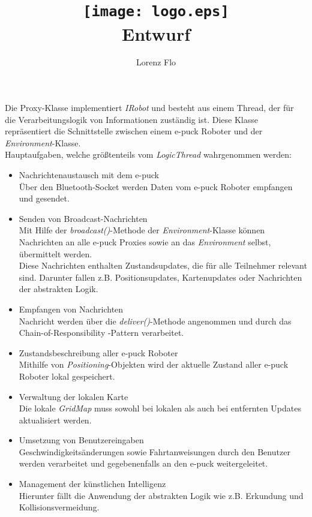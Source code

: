 \documentclass[10pt,a4paper]{article}
\title{
	\texttt{[image: logo.eps]} \\
	\vspace{1cm}
	Entwurf
}
\author{Lorenz Flo}
\begin{document}
	Die Proxy-Klasse implementiert \textit{IRobot} und besteht aus einem Thread, der für die Verarbeitungslogik von
	Informationen zuständig ist. Diese Klasse repräsentiert die Schnittstelle zwischen einem e-puck Roboter und der
	\textit{Environment}-Klasse. \\
	Hauptaufgaben, welche größtenteils vom \textit{LogicThread} wahrgenommen werden:
	\begin{itemize}
		\item Nachrichtenaustausch mit dem e-puck \\
			Über den Bluetooth-Socket werden Daten vom e-puck Roboter empfangen und gesendet.
		\item Senden von Broadcast-Nachrichten \\
			Mit Hilfe der \textit{broadcast()}-Methode der \textit{Environment}-Klasse können Nachrichten an alle
			e-puck Proxies sowie an das \textit{Environment} selbst, übermittelt werden. \\
			Diese Nachrichten enthalten	Zustandsupdates, die für alle Teilnehmer relevant sind. Darunter fallen z.B.
			Positionsupdates, Kartenupdates oder Nachrichten der abstrakten Logik.
		\item Empfangen von Nachrichten  \\
			Nachricht werden über die \textit{deliver()}-Methode angenommen und durch das Chain-of-Responsibility
			-Pattern verarbeitet.
		\item Zustandsbeschreibung aller e-puck Roboter \\
			Mithilfe von \textit{Positioning}-Objekten wird der aktuelle Zustand aller e-puck Roboter lokal gespeichert.
		\item Verwaltung der lokalen Karte \\
			Die lokale \textit{GridMap} muss sowohl bei lokalen als auch bei entfernten Updates aktualisiert werden. 
		\item Umsetzung von Benutzereingaben \\
			Geschwindigkeitsänderungen sowie Fahrtanweisungen durch den Benutzer werden verarbeitet und gegebenenfalls
			an den e-puck weitergeleitet.
		\item Management der künstlichen Intelligenz \\
			Hierunter fällt die Anwendung der abstrakten Logik wie z.B. Erkundung und Kollisionsvermeidung.
	\end{itemize}
	

						
\end{document}
